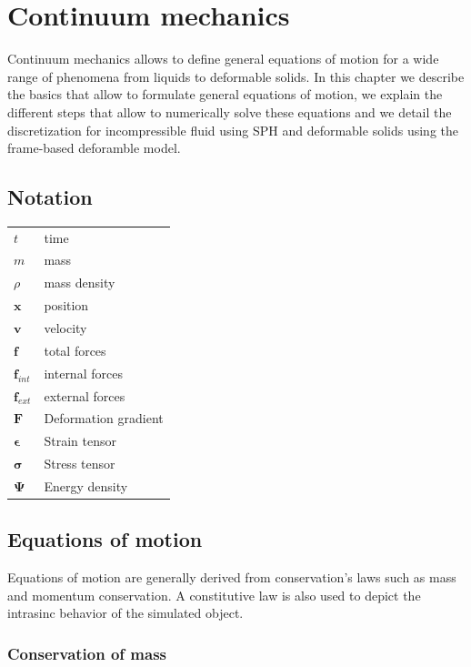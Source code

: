 \section{Continuum mechanics}

Continuum mechanics allows to define general equations of motion for a wide range of phenomena from liquids to deformable solids. In this chapter we describe the basics that allow to formulate general equations of motion, we explain the different steps that allow to numerically solve these equations and we detail the discretization for incompressible fluid using SPH and deformable solids using the frame-based deforamble model.

\subsection{Notation}

\begin{table}[!h]
\begin{tabular}{ll}
$t$ & time \\
$m$ &  mass \\
$\rho$ & mass density \\
$\mathbf{x}$ & position \\
$\mathbf{v}$ & velocity \\
$\mathbf{f}$ & total forces \\
$\mathbf{f}_{int}$ & internal forces \\
$\mathbf{f}_{ext}$ & external forces \\
$\mathbf{F}$ & Deformation gradient \\
$\mathbf{\epsilon}$ & Strain tensor \\
$\mathbf{\sigma}$ & Stress tensor \\
$\mathbf{\Psi}$ & Energy density
\end{tabular}
\end{table}

\subsection{Equations of motion}

Equations of motion are generally derived from conservation's laws such as mass and momentum conservation. A constitutive law is also used to depict the intrasinc behavior of the simulated object.

\subsubsection{Conservation of mass}

